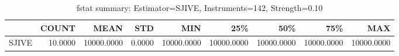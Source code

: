 \begin{table}[ht]
\centering
\caption{fstat summary: Estimator=SJIVE, Instruments=142, Strength=0.10}
\begin{tabular}{lrrrrrrrr}
\toprule
 & COUNT & MEAN & STD & MIN & 25\% & 50\% & 75\% & MAX \\
\midrule
SJIVE & 10.0000 & 10000.0000 & 0.0000 & 10000.0000 & 10000.0000 & 10000.0000 & 10000.0000 & 10000.0000 \\
\bottomrule
\end{tabular}
\end{table}
